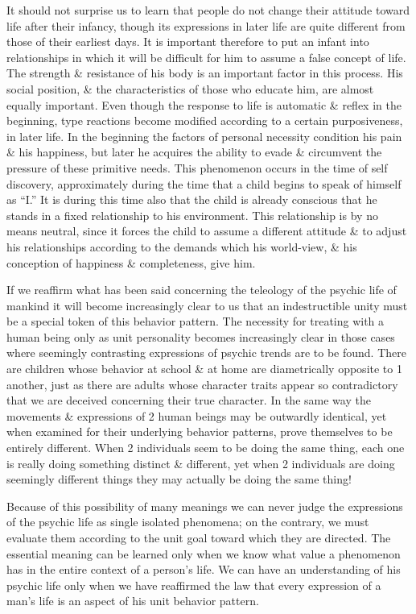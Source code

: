 \documentclass{article}
\begin{document}
It should not surprise us to learn that people do not change their attitude toward life after their infancy, though its expressions in later life are quite different from those of their earliest days. It is important therefore to put an infant into relationships in which it will be difficult for him to assume a false concept of life. The strength \& resistance of his body is an important factor in this process. His social position, \& the characteristics of those who educate him, are almost equally important. Even though the response to life is automatic \& reflex in the beginning, type reactions become modified according to a certain purposiveness, in later life. In the beginning the factors of personal necessity condition his pain \& his happiness, but later he acquires the ability to evade \& circumvent the pressure of these primitive needs. This phenomenon occurs in the time of self discovery, approximately during the time that a child begins to speak of himself as ``I.'' It is during this time also that the child is already conscious that he stands in a fixed relationship to his environment. This relationship is by no means neutral, since it forces the child to assume a different attitude \& to adjust his relationships according to the demands which his world-view, \& his conception of happiness \& completeness, give him.

If we reaffirm what has been said concerning the teleology of the psychic life of mankind it will become increasingly clear to us that an indestructible unity must be a special token of this behavior pattern. The necessity for treating with a human being only as unit personality becomes increasingly clear in those cases where seemingly contrasting expressions of psychic trends are to be found. There are children whose behavior at school \& at home are diametrically opposite to 1 another, just as there are adults whose character traits appear so contradictory that we are deceived concerning their true character. In the same way the movements \& expressions of 2 human beings may be outwardly identical, yet when examined for their underlying behavior patterns, prove themselves to be entirely different. When 2 individuals seem to be doing the same thing, each one is really doing something distinct \& different, yet when 2 individuals are doing seemingly different things they may actually be doing the same thing!

Because of this possibility of many meanings we can never judge the expressions of the psychic life as single isolated phenomena; on the contrary, we must evaluate them according to the unit goal toward which they are directed. The essential meaning can be learned only when we know what value a phenomenon has in the entire context of a person's life. We can have an understanding of his psychic life only when we have reaffirmed the law that every expression of a man's life is an aspect of his unit behavior pattern.
\end{document}
